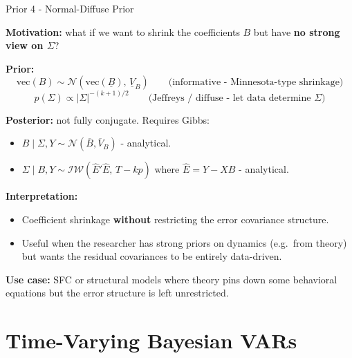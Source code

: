 \documentclass{beamer}
\begin{document}
\begin{frame}{Prior 4 - Normal-Diffuse Prior}
\footnotesize

\textbf{Motivation:} what if we want to shrink the coefficients $B$ but have \textbf{no strong view on $\Sigma$}?

\medskip
\textbf{Prior:}
\[
\text{vec}(B) \sim \mathcal{N}(\text{vec}(\underline{B}),\, \underline{V}_B)
\qquad\text{(informative - Minnesota-type shrinkage)}
\]
\[
p(\Sigma) \propto |\Sigma|^{-(k+1)/2}
\qquad\text{(Jeffreys / diffuse - let data determine $\Sigma$)}
\]

\medskip
\textbf{Posterior:} not fully conjugate. Requires Gibbs:
\begin{itemize}
  \item $B \mid \Sigma, Y \sim \mathcal{N}(\overline{B}, \overline{V}_B)$ - analytical.
  \item $\Sigma \mid B, Y \sim \mathcal{IW}(\hat{E}'\hat{E},\, T-kp)$ where $\hat{E} = Y - XB$ - analytical.
\end{itemize}

\medskip
\textbf{Interpretation:}
\begin{itemize}
  \item Coefficient shrinkage \textbf{without} restricting the error covariance structure.
  \item Useful when the researcher has strong priors on dynamics (e.g.\ from theory) but wants the
        residual covariances to be entirely data-driven.
\end{itemize}

\textbf{Use case:} SFC or structural models where theory pins down some behavioral equations
but the error structure is left unrestricted.

\end{frame}


\section{Time-Varying Bayesian VARs}
\end{document}
